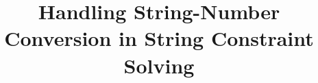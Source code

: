 \documentclass[sigplan,review,anonymous]{acmart}\settopmatter{printfolios=true,printccs=false,printacmref=false}
\title{Handling String-Number Conversion in String Constraint Solving}
\author{}
\begin{document}
\newcommand{\hide}[1]{}
\newcommand{\tool}{{\textsf{Z3-PFA}}}

\newcommand{\nat}{\mathbb{N}}
\newcommand{\integers}{\mathbb{Z}}
\newcommand{\todo}[1]{{\color{blue}TODO: #1}}
\newcommand{\lh}[1]{{\color{orange}Lukas: #1}}
\newcommand{\yfc}[1]{{\color{blue}YFC: #1}}
\newcommand{\petr}[1]{{\color{pink}Petr: #1}}
\newcommand{\chatAt}[2]{\mbox{\textsf{charAt}($#1$, $#2$)}}
\newcommand{\ite}[3]{\mbox{\textsf{ite}($#1$, $#2$, $#3$)}}
\newcommand{\sti}[1]{\mbox{\textsf{toNum}($#1$)}}
\newcommand{\its}[1]{\mbox{\textsf{toStr}($#1$)}}
\newcommand{\varn}{\mbox{$\mathbb{V}_{\mathbb{Z}}$}}
\newcommand{\vars}{\mbox{$\mathbb{V}_{\Sigma^*}$}}
\newcommand{\cvars}{\mbox{$\mathbb{V}_{\Sigma_\epsilon}$}}
\newcommand{\pvars}{\mbox{$\mathbb{V}_{\sharp}$}}
\newcommand{\cvarone}{V}
\newcommand{\cvartwo}{V'}
\newcommand{\cvar}{V}
\newcommand{\modelsof}[1]{[\![#1]\!]}
\newcommand{\true}{\mbox{$\mathsf{true}$}}
\newcommand{\false}{\mbox{$\mathsf{false}$}}
\newcommand{\enc}[1]{[\![#1]\!]}
\newcommand{\parikhof}[1]{\mathbb{P}{(#1)}}
\newcommand{\parikhwof}[2]{|#1|_{#2}}
\newcommand{\semof}[1]{\modelsof{#1}}
\newcommand{\decode}[1]{\mathit{decode_{#1}}}
\newcommand{\parikhfof}[1]{\Phi_{\mathbb{P}}(#1)} %
\newcommand{\pim}{I_{\#}}
\newcommand{\syncop}{\times}
\newcommand{\syncof}[2]{#1 \syncop #2}
\newcommand{\syncfof}[2]{\Psi_{\syncof {#1} {#2}}}
\newcommand{\syncT}{T_\syncop}
\newcommand{\pvarsof}[1]{\#{#1}}
\newcommand{\pvar}{\pvarsof V}
\newcommand{\pvarone}{\pvarsof V}
\newcommand{\pvartwo}{\pvarsof {V'}}
\newcommand{\defeq}{::=}
\newcommand{\encode}[1]{\mathit{encode}_{#1}}
\newcommand{\eqwrt}[1]{=_{#1}}
\newcommand{\iequiv}{\equiv}
\newcommand{\restrict}[2]{#1{\restriction_{#2}}}
\newcommand{\underf}[2]{\mathit{under}_#1(#2)}
\newcommand{\pfaf}{\psi}

\newcommand{\leftA}{A^{\mathit{left}}}
\newcommand{\rightA}{A^{\mathit{right}}}
\newcommand{\leftV}{V^{\mathit{left}}}
\newcommand{\rightV}{V^{\mathit{right}}}
\newcommand\renvars{V_R^\mathsf{ver}}

\newcommand\insc{\phi_{\mathit{in}}}
\newcommand\outlf{\Psi_{\mathit{out}}}
\end{document}

